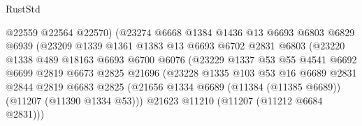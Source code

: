 \begin{lexlean}{RustStd}
\begin{coremodule}
                                  @22559
                                  @22564
                                  @22570)
                                (@23274
                                  @6668
                                  @1384
                                  @1436
                                  @13
                                  @6693
                                  @6803
                                  @6829
                                  @6939
                                  (@23209
                                    @1339
                                    @1361
                                    @1383
                                    @13
                                    @6693
                                    @6702
                                    @2831
                                    @6803
                                    (@23220
                                      @1338
                                      @489
                                      @18163
                                      @6693
                                      @6700
                                      @6076
                                      (@23229
                                        @1337
                                        @53
                                        @55
                                        @4541
                                        @6692
                                        @6699
                                        @2819
                                        @6673
                                        @2825
                                        @21696
                                        (@23228
                                          @1335
                                          @103
                                          @53
                                          @16
                                          @6689
                                          @2831
                                          @2844
                                          @2819
                                          @6683
                                          @2825
                                          (@21656
                                            @1334
                                            @6689
                                            (@11384 (@11385 @6689))
                                            (@11207 (@11390 @1334 @53)))
                                          @21623
                                          @11210
                                          (@11207 (@11212 @6684 @2831)))

\end{coremodule}
\end{lexlean}
